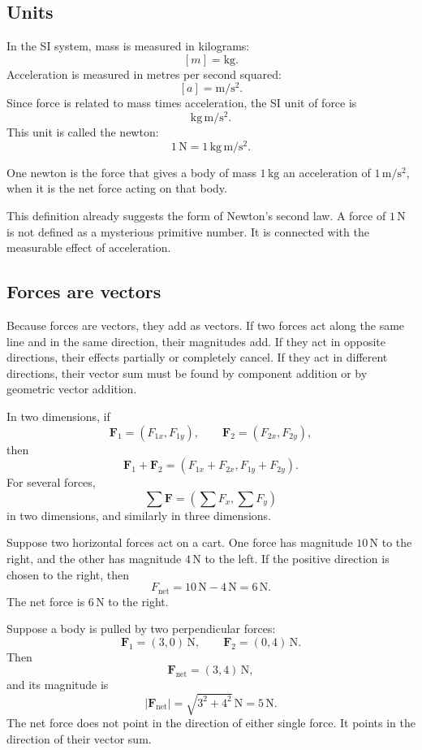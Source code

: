\subsection{Units}

In the SI system, mass is measured in kilograms:
\[
[m]=\mathrm{kg}.
\]
Acceleration is measured in metres per second squared:
\[
[a]=\mathrm{m/s^2}.
\]
Since force is related to mass times acceleration, the SI unit of force is
\[
\mathrm{kg\,m/s^2}.
\]
This unit is called the newton:
\[
1\,\mathrm{N}=1\,\mathrm{kg\,m/s^2}.
\]

\begin{definitionbox}
One newton is the force that gives a body of mass \(1\,\mathrm{kg}\) an acceleration of \(1\,\mathrm{m/s^2}\), when it is the net force acting on that body.
\end{definitionbox}

This definition already suggests the form of Newton's second law. A force of \(1\,\mathrm{N}\) is not defined as a mysterious primitive number. It is connected with the measurable effect of acceleration.

\subsection{Forces are vectors}

Because forces are vectors, they add as vectors. If two forces act along the same line and in the same direction, their magnitudes add. If they act in opposite directions, their effects partially or completely cancel. If they act in different directions, their vector sum must be found by component addition or by geometric vector addition.

In two dimensions, if
\[
\mathbf{F}_1=(F_{1x},F_{1y}),
\qquad
\mathbf{F}_2=(F_{2x},F_{2y}),
\]
then
\[
\mathbf{F}_1+\mathbf{F}_2
=
(F_{1x}+F_{2x},F_{1y}+F_{2y}).
\]
For several forces,
\[
\sum \mathbf{F}
=
\left(\sum F_x,\sum F_y\right)
\]
in two dimensions, and similarly in three dimensions.

\begin{examplebox}
Suppose two horizontal forces act on a cart. One force has magnitude \(10\,\mathrm{N}\) to the right, and the other has magnitude \(4\,\mathrm{N}\) to the left. If the positive direction is chosen to the right, then
\[
F_{\mathrm{net}}=10\,\mathrm{N}-4\,\mathrm{N}=6\,\mathrm{N}.
\]
The net force is \(6\,\mathrm{N}\) to the right.
\end{examplebox}

\begin{examplebox}
Suppose a body is pulled by two perpendicular forces:
\[
\mathbf{F}_1=(3,0)\,\mathrm{N},
\qquad
\mathbf{F}_2=(0,4)\,\mathrm{N}.
\]
Then
\[
\mathbf{F}_{\mathrm{net}}=(3,4)\,\mathrm{N},
\]
and its magnitude is
\[
|\mathbf{F}_{\mathrm{net}}|=\sqrt{3^2+4^2}\,\mathrm{N}=5\,\mathrm{N}.
\]
The net force does not point in the direction of either single force. It points in the direction of their vector sum.
\end{examplebox}

